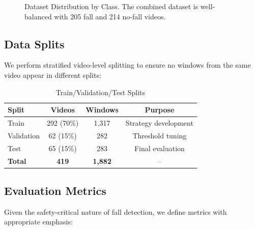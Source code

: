 \documentclass[conference]{IEEEtran}
\begin{document}
\begin{figure}[H]
\centering
{}
\caption{Dataset Distribution by Class. The combined dataset is well-balanced with 205 fall and 214 no-fall videos.}
\label{fig:dataset_dist}
\end{figure}

\subsection{Data Splits}

We perform stratified video-level splitting to ensure no windows from the same video appear in different splits:

\begin{table}[H]
\centering
\caption{Train/Validation/Test Splits}
\label{tab:splits}
\begin{tabular}{lccc}
\toprule
\textbf{Split} & \textbf{Videos} & \textbf{Windows} & \textbf{Purpose} \\
\midrule
Train & 292 (70\%) & 1,317 & Strategy development \\
Validation & 62 (15\%) & 282 & Threshold tuning \\
Test & 65 (15\%) & 283 & Final evaluation \\
\midrule
\textbf{Total} & \textbf{419} & \textbf{1,882} & -- \\
\bottomrule
\end{tabular}
\end{table}

\subsection{Evaluation Metrics}

Given the safety-critical nature of fall detection, we define metrics with appropriate emphasis:
\end{document}
